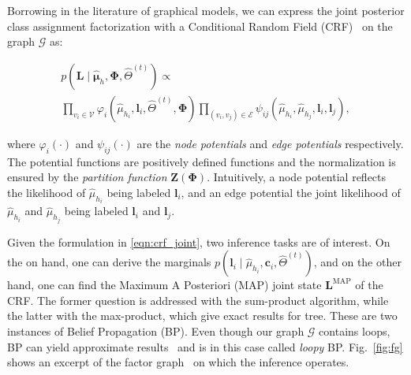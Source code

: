 Borrowing in the literature of graphical models, we can express the joint
posterior class assignment factorization with a Conditional Random Field
(CRF)~\cite{lafferty01conditional} on the graph $\mathcal{G}$ as:

\begin{eqnarray}
\label{eqn:crf_joint}
p(\mathbf{L}\mid\hat{\boldsymbol\mu}_h,\boldsymbol{\Phi},\hat{\Theta}^{(t)})
\propto
\phantom{aaaaaaaaaaaaaaaaaaaaaaaaaaaa}\\ \nonumber
\prod_{v_i\in\mathcal{V}}
\varphi_i(\hat{\mu}_{h_i},\mathbf{l}_i,\hat{\Theta}^{(t)},\boldsymbol{\Phi})
\prod_{(v_i,v_j)\in\mathcal{E}}\psi_{ij}(\hat{\mu}_{h_i},\hat{\mu}_{h_j},
\mathbf{l}_i,\mathbf{l}_j),
\end{eqnarray}

where $\varphi_i(\cdot)$ and $\psi_{ij}(\cdot)$ are the \emph{node potentials}
and \emph{edge potentials} respectively. The potential functions are positively
defined functions and the normalization is ensured by the
\emph{partition function} $\mathbf{Z}(\boldsymbol{\Phi})$. Intuitively, a node 
potential reflects the likelihood of $\hat{\mu}_{h_i}$ being labeled
$\mathbf{l}_i$, and an edge potential the joint likelihood of $\hat{\mu}_{h_i}$
and $\hat{\mu}_{h_j}$ being labeled $\mathbf{l}_i$ and $\mathbf{l}_j$.

Given the formulation in \eqref{eqn:crf_joint}, two inference tasks are of
interest. On the on hand, one can derive the marginals
$p(\mathbf{l}_i\mid\hat{\mu}_{h_i},\mathbf{c}_i,\hat{\Theta}^{(t)})$, and on the
other hand, one can find the Maximum A Posteriori (MAP) joint state
$\mathbf{L}^\text{MAP}$ of the CRF. The former question is addressed with the
sum-product algorithm, while the latter with the max-product, which give exact
results for tree. These are two instances of Belief Propagation (BP). Even
though our graph $\mathcal{G}$ contains loops, BP can yield approximate
results~\cite{mooij07sufficient} and is in this case called \emph{loopy} BP.
Fig.~\ref{fig:fg} shows an excerpt of the factor
graph~\cite{kschischang01factor} on which the inference operates.

